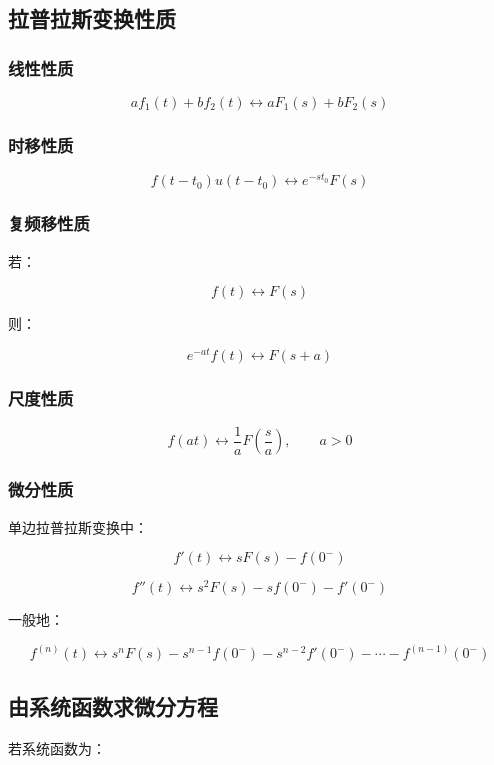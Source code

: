 \documentclass[UTF8]{ctexart}
\begin{document}
\subsection{拉普拉斯变换性质}

\subsubsection{线性性质}

\[
af_1(t)+bf_2(t)\leftrightarrow aF_1(s)+bF_2(s)
\]

\subsubsection{时移性质}

\[
f(t-t_0)u(t-t_0)\leftrightarrow e^{-st_0}F(s)
\]

\subsubsection{复频移性质}

若：

\[
f(t)\leftrightarrow F(s)
\]

则：

\[
e^{-at}f(t)\leftrightarrow F(s+a)
\]

\subsubsection{尺度性质}

\[
f(at)\leftrightarrow \frac{1}{a}F\left(\frac{s}{a}\right),\qquad a>0
\]

\subsubsection{微分性质}

单边拉普拉斯变换中：

\[
f'(t)\leftrightarrow sF(s)-f(0^-)
\]

\[
f''(t)\leftrightarrow s^2F(s)-sf(0^-)-f'(0^-)
\]

一般地：

\[
f^{(n)}(t)\leftrightarrow s^nF(s)-s^{n-1}f(0^-)-s^{n-2}f'(0^-)-\cdots-f^{(n-1)}(0^-)
\]

\subsection{由系统函数求微分方程}

若系统函数为：
\end{document}
